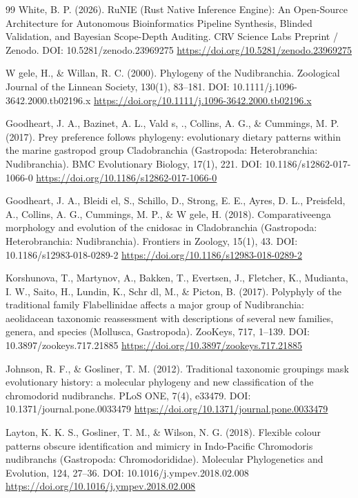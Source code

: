 \documentclass[10pt,letterpaper]{article}
\begin{document}
\begin{thebibliography}{99}
 White, B. P. (2026). RuNIE (Rust Native Inference Engine): An Open-Source Architecture for Autonomous Bioinformatics Pipeline Synthesis, Blinded Validation, and Bayesian Scope-Depth Auditing. CRV Science Labs Preprint / Zenodo. DOI: 10.5281/zenodo.23969275 \url{https://doi.org/10.5281/zenodo.23969275}

 W gele, H., \& Willan, R. C. (2000). Phylogeny of the Nudibranchia. Zoological Journal of the Linnean Society, 130(1), 83--181. DOI: 10.1111/j.1096-3642.2000.tb02196.x \url{https://doi.org/10.1111/j.1096-3642.2000.tb02196.x}

 Goodheart, J. A., Bazinet, A. L., Vald s,  ., Collins, A. G., \& Cummings, M. P. (2017). Prey preference follows phylogeny: evolutionary dietary patterns within the marine gastropod group Cladobranchia (Gastropoda: Heterobranchia: Nudibranchia). BMC Evolutionary Biology, 17(1), 221. DOI: 10.1186/s12862-017-1066-0 \url{https://doi.org/10.1186/s12862-017-1066-0}

 Goodheart, J. A., Bleidi el, S., Schillo, D., Strong, E. E., Ayres, D. L., Preisfeld, A., Collins, A. G., Cummings, M. P., \& W gele, H. (2018). Comparativeenga morphology and evolution of the cnidosac in Cladobranchia (Gastropoda: Heterobranchia: Nudibranchia). Frontiers in Zoology, 15(1), 43. DOI: 10.1186/s12983-018-0289-2 \url{https://doi.org/10.1186/s12983-018-0289-2}

 Korshunova, T., Martynov, A., Bakken, T., Evertsen, J., Fletcher, K., Mudianta, I. W., Saito, H., Lundin, K., Schr dl, M., \& Picton, B. (2017). Polyphyly of the traditional family Flabellinidae affects a major group of Nudibranchia: aeolidacean taxonomic reassessment with descriptions of several new families, genera, and species (Mollusca, Gastropoda). ZooKeys, 717, 1--139. DOI: 10.3897/zookeys.717.21885 \url{https://doi.org/10.3897/zookeys.717.21885}

 Johnson, R. F., \& Gosliner, T. M. (2012). Traditional taxonomic groupings mask evolutionary history: a molecular phylogeny and new classification of the chromodorid nudibranchs. PLoS ONE, 7(4), e33479. DOI: 10.1371/journal.pone.0033479 \url{https://doi.org/10.1371/journal.pone.0033479}

 Layton, K. K. S., Gosliner, T. M., \& Wilson, N. G. (2018). Flexible colour patterns obscure identification and mimicry in Indo-Pacific Chromodoris nudibranchs (Gastropoda: Chromodorididae). Molecular Phylogenetics and Evolution, 124, 27--36. DOI: 10.1016/j.ympev.2018.02.008 \url{https://doi.org/10.1016/j.ympev.2018.02.008}


\end{thebibliography}
\end{document}
